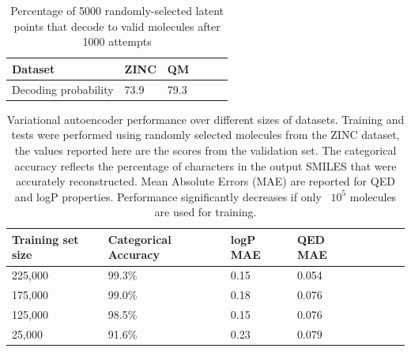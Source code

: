\begin{table}[h]
\centering
\caption{Percentage of 5000 randomly-selected latent points that decode to valid molecules after 1000 attempts}
\begin{tabular}{lp{1cm}lp{1cm}lp{1cm}}
\hline
Dataset & ZINC & QM \\
\hline
Decoding probability & 73.9 & 79.3 \\
\end{tabular}
\label{tab:random_sampling_statistics}
\end{table}


\begin{table}[h]
\centering
\caption{ Variational autoencoder performance over different sizes of datasets. Training and tests were performed using randomly selected molecules from the ZINC dataset, the values reported here are the scores from the validation set. The categorical accuracy reflects the percentage of characters in the output SMILES that were accurately reconstructed. Mean Absolute Errors (MAE) are reported for QED and logP properties. Performance significantly decreases if only ~$10^5$ molecules are used for training.}
\begin{tabular}{lp{1cm}lp{1cm}lp{1cm}lp{1cm}}
\hline
Training set size &  Categorical Accuracy & logP MAE & QED MAE\\
\hline
225,000 & 99.3\% & 0.15 & 0.054 \\
175,000 & 99.0\% & 0.18 & 0.076 \\
125,000 & 98.5\% & 0.15 & 0.076 \\
25,000 & 91.6\% & 0.23 & 0.079 \\
\hline
\end{tabular}
\label{tab:Accuracy_by_training_size}
\end{table}

